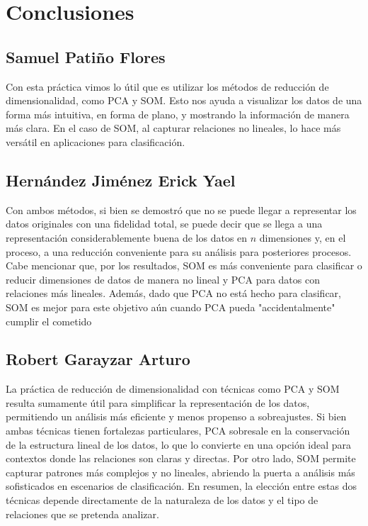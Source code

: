 \section[Conclusiones]{Conclusiones}

\subsection[SPF]{Samuel Patiño Flores}
Con esta práctica vimos lo útil que es utilizar los métodos de reducción de dimensionalidad, como PCA y SOM. Esto nos ayuda a visualizar los datos de una forma más intuitiva, en forma de plano, y mostrando la información de manera más clara. En el caso de SOM, al capturar relaciones no lineales, lo hace más versátil en aplicaciones para clasificación.

\subsection[HJEY]{Hernández Jiménez Erick Yael}
Con ambos métodos, si bien se demostró que no se puede llegar a representar los datos originales con una fidelidad total, se puede decir que se llega a una representación considerablemente buena de los datos en $n$ dimensiones y, en el proceso, a una reducción conveniente para su análisis para posteriores procesos.  Cabe mencionar que, por los resultados, SOM es más conveniente para clasificar o reducir dimensiones de datos de manera no lineal y PCA para datos con relaciones más lineales. Además, dado que PCA no está hecho para clasificar, SOM es mejor para este objetivo aún cuando PCA pueda "accidentalmente" cumplir el cometido

\subsection[RGA]{Robert Garayzar Arturo}
La práctica de reducción de dimensionalidad con técnicas como PCA y SOM resulta sumamente útil para simplificar la representación de los datos, permitiendo un análisis más eficiente y menos propenso a sobreajustes. Si bien ambas técnicas tienen fortalezas particulares, PCA sobresale en la conservación de la estructura lineal de los datos, lo que lo convierte en una opción ideal para contextos donde las relaciones son claras y directas. Por otro lado, SOM permite capturar patrones más complejos y no lineales, abriendo la puerta a análisis más sofisticados en escenarios de clasificación. En resumen, la elección entre estas dos técnicas depende directamente de la naturaleza de los datos y el tipo de relaciones que se pretenda analizar.